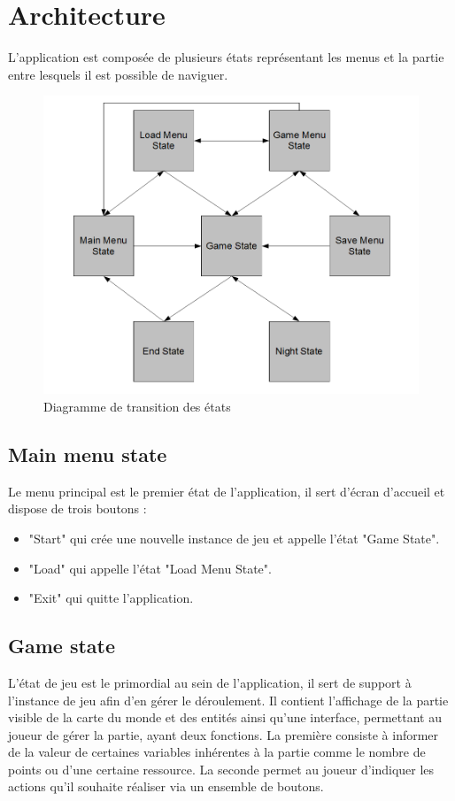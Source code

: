 \documentclass[a4paper]{memoir}
\begin{document}
		\section{Architecture}
			L'application est composée de plusieurs états représentant les menus et la partie entre lesquels il est possible de naviguer.
			\begin{figure}[H]
				\begin{center}
					\includegraphics[scale=0.35]{img/DiagrammeTransitionState.png}
				\end{center}
				\label{fig:state}
				\caption{Diagramme de transition des états}
			\end{figure}
			
			\subsection{Main menu state}
				Le menu principal est le premier état de l’application, il sert d’écran d’accueil et dispose de trois boutons :
				\begin{itemize}[label=$\bullet$]
					\item "Start" qui crée une nouvelle instance de jeu et appelle l’état "Game State".
					\item "Load" qui appelle l’état "Load Menu State".
					\item "Exit" qui quitte l’application.
				\end{itemize}
				
			\subsection{Game state}
				L’état de jeu est le primordial au sein de l’application, il sert de support à l’instance de jeu afin d’en gérer le déroulement. Il contient l’affichage de la partie visible de la carte du monde et des entités ainsi qu’une interface, permettant au joueur de gérer la partie, ayant deux fonctions. La première consiste à informer de la valeur de certaines variables inhérentes à la partie comme le nombre de points ou d’une certaine ressource. La seconde permet au joueur d’indiquer les actions qu’il souhaite réaliser via un ensemble de boutons.
				
\end{document}
